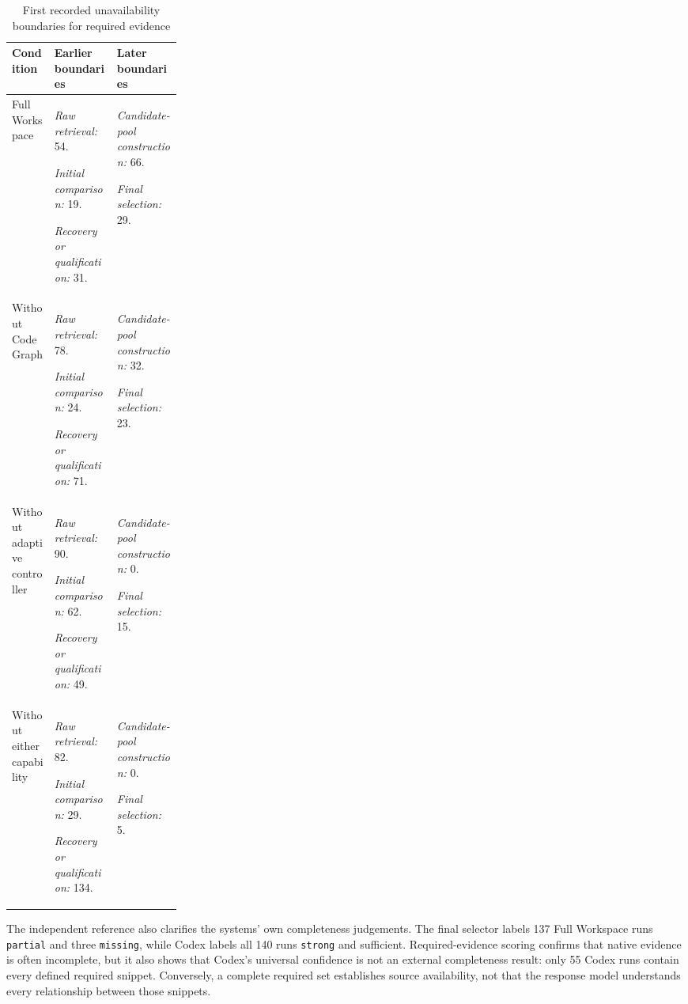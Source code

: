 \begin{table}[htbp]
\centering
\caption{First recorded unavailability boundaries for required evidence}
\label{tab:required-evidence-survival-and-completeness-5}

\begingroup
\small
\setlength{\tabcolsep}{4pt}
\renewcommand{\arraystretch}{1.12}
\begin{tabularx}{\linewidth}{@{}L{0.25\linewidth}YY@{}}
\toprule
\textbf{Condition} & \textbf{Earlier boundaries} & \textbf{Later boundaries} \\
\midrule
Full Workspace
& \textit{Raw retrieval:} 54.
  \par\textit{Initial comparison:} 19.
  \par\textit{Recovery or qualification:} 31.
& \textit{Candidate-pool construction:} 66.
  \par\textit{Final selection:} 29. \\

Without CodeGraph
& \textit{Raw retrieval:} 78.
  \par\textit{Initial comparison:} 24.
  \par\textit{Recovery or qualification:} 71.
& \textit{Candidate-pool construction:} 32.
  \par\textit{Final selection:} 23. \\

Without adaptive controller
& \textit{Raw retrieval:} 90.
  \par\textit{Initial comparison:} 62.
  \par\textit{Recovery or qualification:} 49.
& \textit{Candidate-pool construction:} 0.
  \par\textit{Final selection:} 15. \\

Without either capability
& \textit{Raw retrieval:} 82.
  \par\textit{Initial comparison:} 29.
  \par\textit{Recovery or qualification:} 134.
& \textit{Candidate-pool construction:} 0.
  \par\textit{Final selection:} 5. \\
\bottomrule
\end{tabularx}
\endgroup
\end{table}
\FloatBarrier

The independent reference also clarifies the systems' own completeness judgements. The final selector labels 137 Full Workspace runs \texttt{partial} and three \texttt{missing}, while Codex labels all 140 runs \texttt{strong} and sufficient. Required-evidence scoring confirms that native evidence is often incomplete, but it also shows that Codex's universal confidence is not an external completeness result: only 55 Codex runs contain every defined required snippet. Conversely, a complete required set establishes source availability, not that the response model understands every relationship between those snippets.


